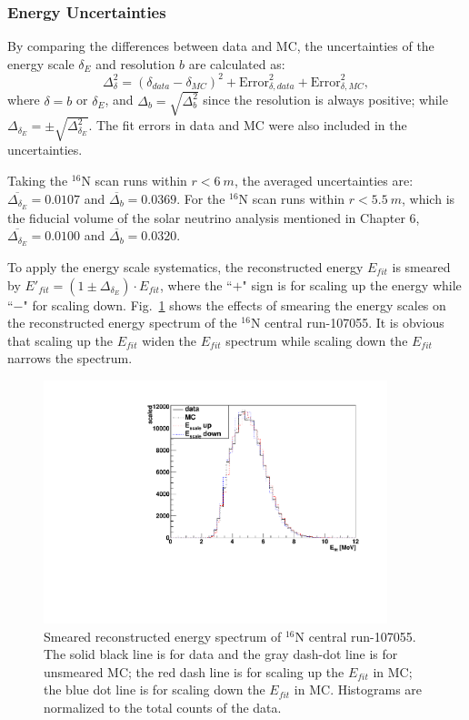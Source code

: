 \subsubsection{Energy Uncertainties}\label{sect:eneryUncertianties}
By comparing the differences between data and MC, the uncertainties of the energy scale $\delta_E$ and resolution $b$ are calculated as:
\begin{equation}
\Delta^2_{\delta}= (\delta_{data}-\delta_{MC})^2+\mathrm{Error}^2_{\delta,data}+\mathrm{Error}^2_{\delta,MC},
\end{equation}
where $\delta=b$ or $\delta_E$, and $\Delta_b=\sqrt{\Delta^2_{b}}$ since the resolution is always positive; while $\Delta_{\delta_E}=\pm\sqrt{\Delta^2_{\delta_E}}$. The fit errors in data and MC were also included in the uncertainties.

Taking the $^{16}$N scan runs within $r<6~m$, the averaged uncertainties are: $\overline{\Delta_{\delta_E}}=0.0107$ and $\overline{\Delta_{b}}=0.0369$. For the $^{16}$N scan runs within $r<5.5~m$, which is the fiducial volume of the solar neutrino analysis mentioned in Chapter 6, $\overline{\Delta_{\delta_E}}=0.0100$ and $\overline{\Delta_{b}}=0.0320$.

To apply the energy scale systematics, the reconstructed energy $E_{fit}$ is smeared by $E'_{fit}=(1\pm\Delta_{\delta_E})\cdot E_{fit}$, where the ``$+$" sign is for scaling up the energy while ``$-$" for scaling down. Fig.~\ref{fig:EscaleSmear} shows the effects of smearing the energy scales on the reconstructed energy spectrum of the $^{16}$N central run-107055. It is obvious that scaling up the $E_{fit}$ widen the $E_{fit}$ spectrum while scaling down the $E_{fit}$ narrows the spectrum. 
\begin{figure}
	\centering
	\includegraphics[width=10cm]{SmearedEscale_N16.pdf}
	\caption[Smeared reconstructed energy spectrum of $^{16}$N central run-107055.]{Smeared reconstructed energy spectrum of $^{16}$N central run-107055. The solid black line is for data and the gray dash-dot line is for unsmeared MC; the red dash line is for scaling up the $E_{fit}$ in MC; the blue dot line is for scaling down the $E_{fit}$ in MC. Histograms are normalized to the total counts of the data.}
	\label{fig:EscaleSmear}
\end{figure}

